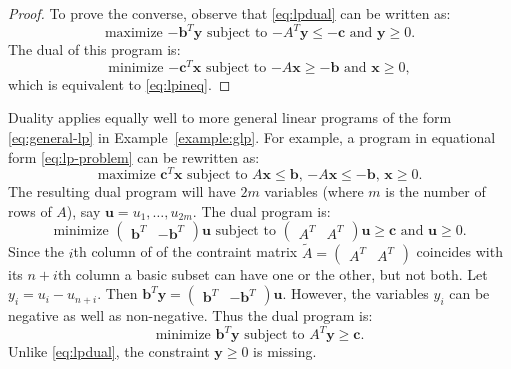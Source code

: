 \documentclass{amsbook}
\newcommand{\xx}{\mathbf x}
\newcommand{\yy}{\mathbf y}
\newcommand{\cc}{\mathbf c}
\newcommand{\bb}{\mathbf b}
\theoremstyle{definition}
\theoremstyle{remark}
\begin{document}
\begin{proof}
  To prove the converse, observe that \eqref{eq:lpdual} can be written as:
  \begin{displaymath}
    \text{maximize $-\bb^T\yy$ subject to $-A^T\yy\leq -\cc$ and $\yy\geq 0$}.
  \end{displaymath}
  The dual of this program is:
  \begin{displaymath}
    \text{minimize $-\cc^T\xx$ subject to $-A\xx\geq -\bb$ and $\xx\geq 0$},
  \end{displaymath}
  which is equivalent to \eqref{eq:lpineq}.
\end{proof}
Duality applies equally well to more general linear programs of the form \eqref{eq:general-lp} in Example~\ref{example:glp}.
For example, a program in equational form \eqref{eq:lp-problem} can be rewritten as:
\begin{displaymath}
  \text{maximize $\cc^T\xx$ subject to  $A\xx\leq \bb$, $-A\xx\leq -\bb$, $\xx\geq 0$}.
\end{displaymath}
The resulting dual program will have $2m$ variables (where $m$ is the number of rows of $A$), say $\mathbf u=u_1,\dotsc,u_{2m}$.
The dual program is:
\begin{displaymath}
  \text{minimize $\begin{pmatrix}\bb^T&-\bb^T\end{pmatrix}\mathbf u$ subject to $\begin{pmatrix} A^T & A^T \end{pmatrix}\mathbf u \geq \cc$ and $\mathbf u\geq 0$}.
\end{displaymath}
Since the $i$th column of of the contraint matrix $\tilde A =
\begin{pmatrix}
  A^T & A^T
\end{pmatrix}$ coincides with its $n+i$th column a basic subset can have one or the other, but not both.
Let $y_i=u_i-u_{n+i}$.
Then $\bb^T\yy=\begin{pmatrix}\bb^T&-\bb^T\end{pmatrix}\mathbf u$.
However, the variables $y_i$ can be negative as well as non-negative.
Thus the dual program is:
\begin{displaymath}
  \text{minimize $\bb^T\yy$ subject to $A^T\yy\geq \cc$}.
\end{displaymath}
Unlike \eqref{eq:lpdual}, the constraint $\yy\geq 0$ is missing.
\end{document}
